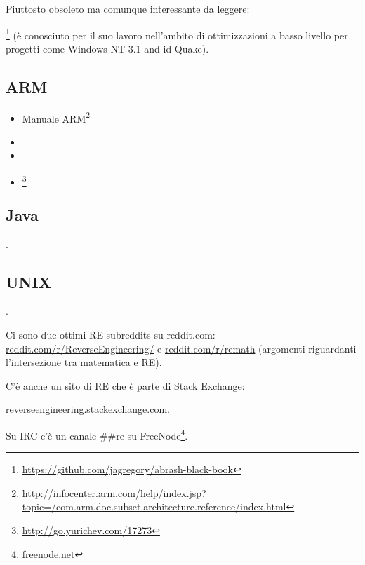 Piuttosto obsoleto ma comunque interessante da leggere:

\MAbrash\footnote{\AlsoAvailableAs \url{https://github.com/jagregory/abrash-black-book}}
(è conosciuto per il suo lavoro nell'ambito di ottimizzazioni a basso livello per progetti come Windows NT 3.1 and id Quake).

\subsection{ARM}

\begin{itemize}
\item Manuale ARM\footnote{\AlsoAvailableAs \url{http://infocenter.arm.com/help/index.jsp?topic=/com.arm.doc.subset.architecture.reference/index.html}}

\item \ARMSevenRef

\item \ARMSixFourRefURL

\item \ARMCookBook\footnote{\AlsoAvailableAs \url{http://go.yurichev.com/17273}}
\end{itemize}


\subsection{Java}

\JavaBook.

\subsection{UNIX}

\TAOUP




\HenryWarren.

Ci sono due ottimi \ac{RE} subreddits su reddit.com:
\href{http://go.yurichev.com/17027}{reddit.com/r/ReverseEngineering/} e
\href{http://go.yurichev.com/17028}{reddit.com/r/remath}
(argomenti riguardanti l'intersezione tra matematica e \ac{RE}).

C'è anche un sito di \ac{RE} che è parte di Stack Exchange:

\par \href{http://go.yurichev.com/17029}{reverseengineering.stackexchange.com}.

Su IRC c'è un canale \#\#re su
FreeNode\footnote{\href{http://go.yurichev.com/17030}{freenode.net}}.

